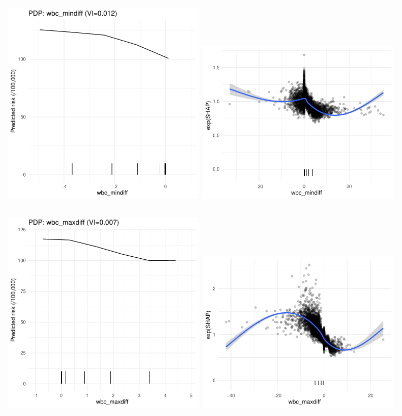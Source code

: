 \documentclass[12pt]{article}
\begin{document}
\begin{figure}[h]
\centering
\includegraphics[width=0.45\textwidth]{figures/pdp_new/wbc_mindiff.pdf}
\includegraphics[width=0.45\textwidth]{figures/shap_new/wbc_mindiff.pdf}
\end{figure}
\begin{figure}[h]
\centering
\includegraphics[width=0.45\textwidth]{figures/pdp_new/wbc_maxdiff.pdf}
\includegraphics[width=0.45\textwidth]{figures/shap_new/wbc_maxdiff.pdf}
\end{figure}
\end{document}
